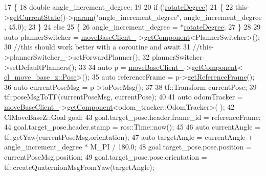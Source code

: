 \begin{DoxyCode}
17 \{
18     \textcolor{keywordtype}{double} angle\_increment\_degree;
19 
20     \textcolor{keywordflow}{if} (!\hyperlink{classcl__move__base__z_1_1CbRotate_a83e9f97e917044f919c98a55d8e00db6}{rotateDegree})
21     \{
22         this->\hyperlink{classsmacc_1_1ISmaccClientBehavior_a34fde34e48fa13db622ee60d8374d0b8}{getCurrentState}()->\hyperlink{classsmacc_1_1ISmaccState_a4f2ff8e3eda8aa9bbb60c8ff17d0def1}{param}(\textcolor{stringliteral}{"angle\_increment\_degree"}, angle\_increment\_degree
      , 45.0);
23     \}
24     \textcolor{keywordflow}{else}
25     \{
26         angle\_increment\_degree = *\hyperlink{classcl__move__base__z_1_1CbRotate_a83e9f97e917044f919c98a55d8e00db6}{rotateDegree};
27     \}
28 
29     \textcolor{keyword}{auto} plannerSwitcher = \hyperlink{classcl__move__base__z_1_1CbMoveBaseClientBehaviorBase_ab2ef219464cfac8659b4a87c8d0db6d5}{moveBaseClient\_}->\hyperlink{classsmacc_1_1ISmaccClient_adef78db601749ca63c19e74a27cb88cc}{getComponent}<PlannerSwitcher>();
30     \textcolor{comment}{//this should work better with a coroutine and await}
31     \textcolor{comment}{//this->plannerSwitcher\_->setForwardPlanner();}
32     plannerSwitcher->setDefaultPlanners();
33 
34     \textcolor{keyword}{auto} p = \hyperlink{classcl__move__base__z_1_1CbMoveBaseClientBehaviorBase_ab2ef219464cfac8659b4a87c8d0db6d5}{moveBaseClient\_}->\hyperlink{classsmacc_1_1ISmaccClient_adef78db601749ca63c19e74a27cb88cc}{getComponent}<
      \hyperlink{classcl__move__base__z_1_1Pose}{cl\_move\_base\_z::Pose}>();
35     \textcolor{keyword}{auto} referenceFrame = p->\hyperlink{classcl__move__base__z_1_1Pose_af8c2dc151e74aa8da6b283d1c8563051}{getReferenceFrame}();
36     \textcolor{keyword}{auto} currentPoseMsg = p->toPoseMsg();
37 
38     tf::Transform currentPose;
39     tf::poseMsgToTF(currentPoseMsg, currentPose);
40 
41     \textcolor{keyword}{auto} odomTracker = \hyperlink{classcl__move__base__z_1_1CbMoveBaseClientBehaviorBase_ab2ef219464cfac8659b4a87c8d0db6d5}{moveBaseClient\_}->\hyperlink{classsmacc_1_1ISmaccClient_adef78db601749ca63c19e74a27cb88cc}{getComponent}<odom\_tracker::OdomTracker>(
      );
42     ClMoveBaseZ::Goal goal;
43     goal.target\_pose.header.frame\_id = referenceFrame;
44     goal.target\_pose.header.stamp = ros::Time::now();
45 
46     \textcolor{keyword}{auto} currentAngle = tf::getYaw(currentPoseMsg.orientation);
47     \textcolor{keyword}{auto} targetAngle = currentAngle + angle\_increment\_degree * M\_PI / 180.0;
48     goal.target\_pose.pose.position = currentPoseMsg.position;
49     goal.target\_pose.pose.orientation = tf::createQuaternionMsgFromYaw(targetAngle);

\end{DoxyCode}
